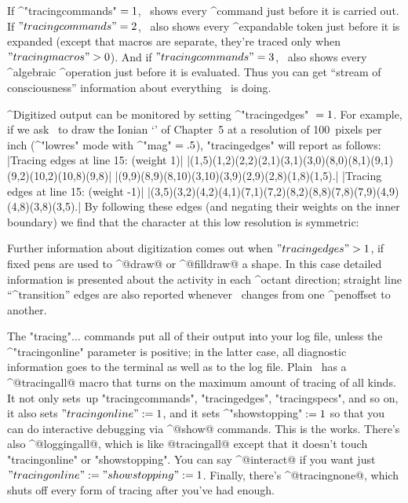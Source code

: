 \danger If ^"tracingcommands"$\null=1$, \MF\ shows every ^{command}
just before it is carried out. If $"tracingcommands"=2$, \MF\ also shows
every ^{ex\-pand\-able token} just before it is expanded (except that
macros are separate, they're traced only when $"tracingmacros">0$). And if
$"tracingcommands"=3$, \MF\ also shows every ^{algebraic} ^{operation}
just before it is evaluated. Thus you can get ``stream of
consciousness'' information about everything \MF\ is doing.

\begingroup\ninepoint
\danger ^{Digitized output} can be monitored by setting ^"tracingedges"%
$\null=1$. For example, if we ask \MF\ to draw the Ionian `{\manual\IOO}'
of Chapter~5 at a resolution of 100~pixels per inch (^"lowres" mode
with ^"mag"$\null=.5$), "tracingedges" will report as follows:\enddanger
\beginlines
|Tracing edges at line 15: (weight 1)|
|(1,5)(1,2)(2,2)(2,1)(3,1)(3,0)(8,0)(8,1)(9,1)(9,2)(10,2)(10,8)(9,8)|
|(9,9)(8,9)(8,10)(3,10)(3,9)(2,9)(2,8)(1,8)(1,5).|
\smallskip
|Tracing edges at line 15: (weight -1)|
|(3,5)(3,2)(4,2)(4,1)(7,1)(7,2)(8,2)(8,8)(7,8)(7,9)(4,9)(4,8)(3,8)(3,5).|
\endlines
By following these edges (and negating their weights on the inner boundary)
we find that the character at this low resolution is symmetric:
\begindisplay
\vbox{\offinterlineskip\manual{}}
\enddisplay

\endgroup
\ddanger Further information about digitization comes out when
$"tracingedges">1$, if fixed pens are used to ^@draw@ or ^@filldraw@ a
shape. In this case detailed information is presented about the activity
in each ^{octant} direction; straight line ``^{transition}'' edges are
also reported whenever \MF\ changes from one ^{penoffset} to another.

\ddanger The "tracing"$\ldots$ commands put all of their output into your log
file, unless the ^"tracingonline" parameter is positive; in the latter
case, all diagnostic information goes to the terminal as well as to the
log file.  Plain \MF\ has a ^@tracingall@ macro that turns on the
maximum amount of tracing of all kinds. It not only sets~up
"tracingcommands", "tracingedges", "tracingspecs", and so on,
it also sets $"tracingonline":=1$, and it sets ^"showstopping"$\null:=1$ so
that you can do interactive debugging via ^@show@ commands. This is the works.
There's also ^@loggingall@, which is like @tracingall@ except that it
doesn't touch "tracingonline" or "showstopping". You can say ^@interact@
if you want just $"tracingonline":="showstopping":=1$. Finally, there's
^@tracingnone@, which shuts off every form of tracing after you've had enough.

